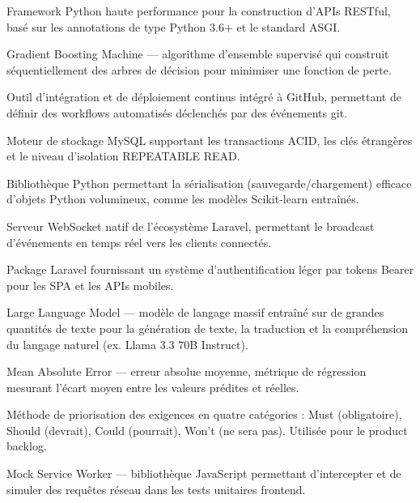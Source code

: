 \begin{description}[leftmargin=4cm, style=nextline]
  \item[FastAPI]
  Framework Python haute performance pour la construction d'APIs RESTful, basé
  sur les annotations de type Python 3.6+ et le standard ASGI.

  \item[GBM]
  Gradient Boosting Machine — algorithme d'ensemble supervisé qui construit
  séquentiellement des arbres de décision pour minimiser une fonction de perte.

  \item[GitHub Actions]
  Outil d'intégration et de déploiement continus intégré à GitHub, permettant
  de définir des workflows automatisés déclenchés par des événements git.

  \item[InnoDB]
  Moteur de stockage MySQL supportant les transactions ACID, les clés étrangères
  et le niveau d'isolation REPEATABLE READ.

  \item[Joblib]
  Bibliothèque Python permettant la sérialisation (sauvegarde/chargement) efficace
  d'objets Python volumineux, comme les modèles Scikit-learn entraînés.

  \item[Laravel Reverb]
  Serveur WebSocket natif de l'écosystème Laravel, permettant le broadcast
  d'événements en temps réel vers les clients connectés.

  \item[Laravel Sanctum]
  Package Laravel fournissant un système d'authentification léger par tokens
  Bearer pour les SPA et les APIs mobiles.

  \item[LLM]
  Large Language Model — modèle de langage massif entraîné sur de grandes quantités
  de texte pour la génération de texte, la traduction et la compréhension du langage
  naturel (ex. Llama 3.3 70B Instruct).

  \item[MAE]
  Mean Absolute Error — erreur absolue moyenne, métrique de régression mesurant
  l'écart moyen entre les valeurs prédites et réelles.

  \item[MoSCoW]
  Méthode de priorisation des exigences en quatre catégories : Must (obligatoire),
  Should (devrait), Could (pourrait), Won't (ne sera pas). Utilisée pour le
  product backlog.

  \item[MSW]
  Mock Service Worker — bibliothèque JavaScript permettant d'intercepter et
  de simuler des requêtes réseau dans les tests unitaires frontend.


\end{description}
